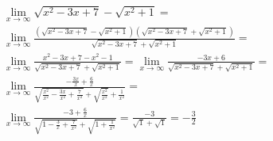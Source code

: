 \begin{ex}
\begin{align}
&\lim_{x\rightarrow \infty} \sqrt{x^2-3x+7}-\sqrt{x^2+1}=\nonumber\\
&\lim_{x\rightarrow \infty} \frac{(\sqrt{x^2-3x+7}-\sqrt{x^2+1})(\sqrt{x^2-3x+7}+\sqrt{x^2+1})}{\sqrt{x^2-3x+7}+\sqrt{x^2+1}}=\nonumber\\
&\lim_{x\rightarrow \infty} \frac{x^2-3x+7-x^2-1}{\sqrt{x^2-3x+7}+\sqrt{x^2+1}}=\lim_{x\rightarrow \infty} \frac{-3x+6}{\sqrt{x^2-3x+7}+\sqrt{x^2+1}}=\nonumber\\
&\lim_{x\rightarrow \infty} \frac{-\frac{3x}{x}+\frac{6}{x}}{\sqrt{\frac{x^2}{x^2}-\frac{3x}{x^2}+\frac{7}{x^2}}+\sqrt{\frac{x^2}{x^2}}+\frac{1}{x^2}}=\nonumber\\
&\lim_{x\rightarrow \infty}\frac{-3+\frac{6}{x}}{\sqrt{1-\frac{3}{x}+\frac{7}{x^2}}+\sqrt{1+\frac{1}{x^2}}}=\frac{-3}{\sqrt{1}+\sqrt{1}}=-\frac{3}{2}\nonumber
\end{align}
\end{ex}
